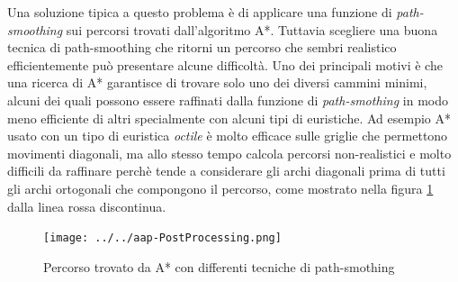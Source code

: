 \documentclass[12pt]{book}
\begin{document}
\par{
Una soluzione tipica a questo problema \`e di applicare una funzione di \emph{path-smoothing} sui percorsi trovati dall'algoritmo A*. Tuttavia scegliere una buona tecnica di path-smoothing che ritorni un percorso che sembri realistico efficientemente pu\`o presentare alcune difficolt\`a. Uno dei principali motivi \`e che una ricerca di A* garantisce di trovare solo uno dei diversi cammini minimi, alcuni dei quali possono essere raffinati dalla funzione di \emph{path-smothing} in modo meno efficiente di altri specialmente con alcuni tipi di euristiche. Ad esempio A* usato con un tipo di euristica \emph{octile} \`e molto efficace sulle griglie che permettono movimenti diagonali, ma allo stesso tempo calcola percorsi non-realistici e molto difficili da raffinare perch\`e tende a considerare gli archi diagonali prima di tutti gli archi ortogonali che compongono il percorso, come mostrato nella figura \ref{img7} dalla linea rossa discontinua.
\begin{figure}[H]
\centering
\texttt{[image: ../../aap-PostProcessing.png]}
\caption{Percorso trovato da A* con differenti tecniche di path-smothing}
\label{img7}
\end{figure}
}

\end{document}
